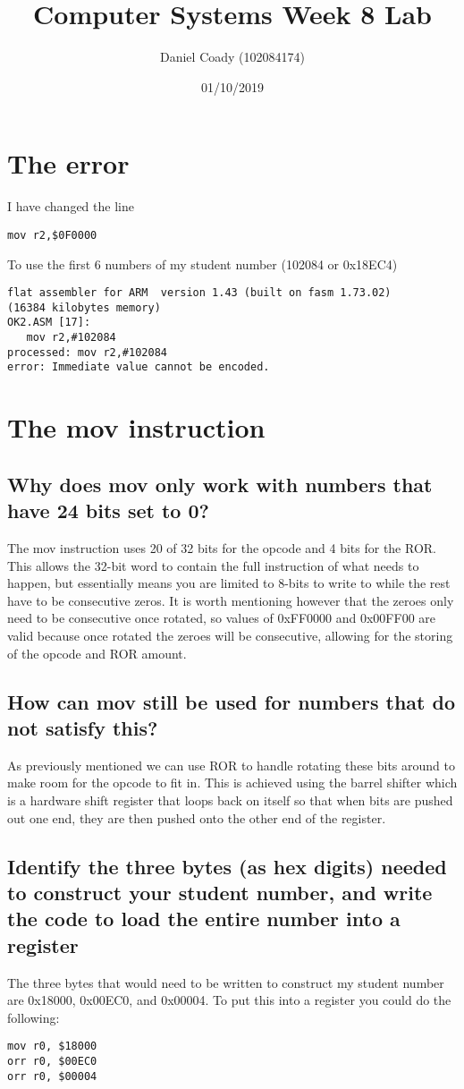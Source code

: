 \documentclass[11pt]{scrartcl}
\title{Computer Systems Week 8 Lab}
\author{Daniel Coady (102084174)}
\date{01/10/2019}
\begin{document}
\maketitle

\section*{The error}
I have changed the line
\begin{verbatim}
mov r2,$0F0000
\end{verbatim}
To use the first 6 numbers of my student number (102084 or 0x18EC4)

\begin{verbatim}
flat assembler for ARM  version 1.43 (built on fasm 1.73.02)
(16384 kilobytes memory)
OK2.ASM [17]:
   mov r2,#102084
processed: mov r2,#102084
error: Immediate value cannot be encoded.
\end{verbatim}

\section*{The mov instruction}
\subsection*{Why does mov only work with numbers that have 24 bits set to 0?}
The mov instruction uses 20 of 32 bits for the opcode and 4 bits for the ROR. This allows
the 32-bit word to contain the full instruction of what needs to happen, but essentially
means you are limited to 8-bits to write to while the rest have to be consecutive zeros.
It is worth mentioning however that the zeroes only need to be consecutive once rotated,
so values of 0xFF0000 and 0x00FF00 are valid because once rotated the zeroes will be
consecutive, allowing for the storing of the opcode and ROR amount.

\subsection*{How can mov still be used for numbers that do not satisfy this?}
As previously mentioned we can use ROR to handle rotating these bits around to make room
for the opcode to fit in. This is achieved using the barrel shifter which is a hardware
shift register that loops back on itself so that when bits are pushed out one end, they
are then pushed onto the other end of the register.

\subsection*{Identify the three bytes (as hex digits) needed to construct your student number, and write the code to load the entire number into a register}
The three bytes that would need to be written to construct my student number are 0x18000,
0x00EC0, and 0x00004. To put this into a register you could do the following:
\begin{verbatim}
mov r0, $18000
orr r0, $00EC0
orr r0, $00004
\end{verbatim}
\end{document}
